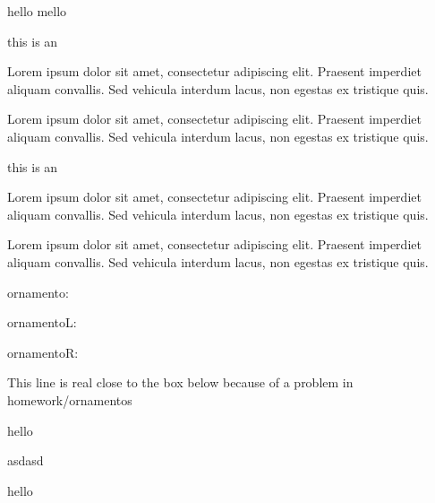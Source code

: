 \documentclass[a4paper]{scrartcl}
\begin{document}
hello mello



this is an 


Lorem ipsum dolor sit amet, consectetur adipiscing elit. Praesent imperdiet aliquam convallis. Sed vehicula interdum lacus, non egestas ex tristique quis.


Lorem ipsum dolor sit amet, consectetur adipiscing elit. Praesent imperdiet aliquam convallis. Sed vehicula interdum lacus, non egestas ex tristique quis.


this is an 


Lorem ipsum dolor sit amet, consectetur adipiscing elit. Praesent imperdiet aliquam convallis. Sed vehicula interdum lacus, non egestas ex tristique quis.




Lorem ipsum dolor sit amet, consectetur adipiscing elit. Praesent imperdiet aliquam convallis. Sed vehicula interdum lacus, non egestas ex tristique quis.

ornamento:

\ornamento

ornamentoL:

\ornamentoLD

ornamentoR:

\ornamentoRD

This line is real close to the box below because of a problem in homework/ornamentos

\begin{theorem}
    hello
\end{theorem}

asdasd

\begin{lemma}
    hello
\end{lemma}
\end{document}
